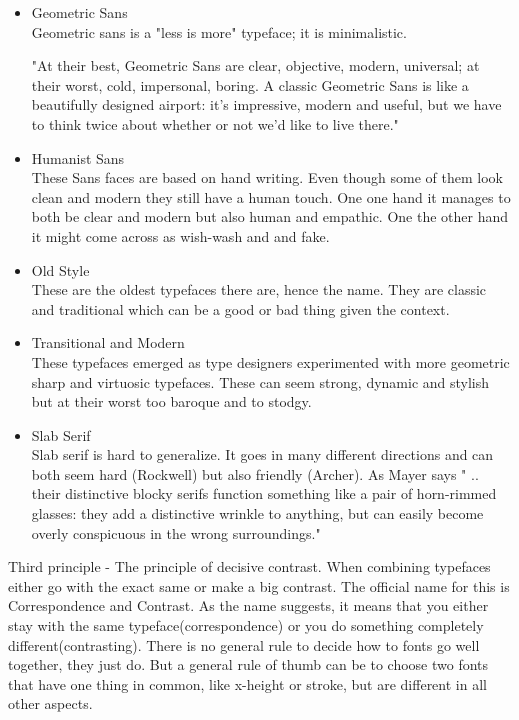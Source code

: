 \begin{itemize}

\item
Geometric Sans
\\
Geometric sans is a "less is more" typeface; it is minimalistic.

"At their best, Geometric Sans are clear, objective, modern, universal; at their worst, cold, impersonal, boring. A classic Geometric Sans is like a beautifully designed airport: it's impressive, modern and useful, but we have to think twice about whether or not we'd like to live there." \cite{Font} %

\item
Humanist Sans
\\
These Sans faces are based on hand writing. Even though some of them look clean and modern they still have a human touch. One one hand it manages to both be clear and modern but also human and empathic. One the other hand it might come across as wish-wash and and fake. \cite{Font}

\item
Old Style
\\
These are the oldest typefaces there are, hence the name. 
They are classic and traditional which can be a good or bad thing given the context. 

\item
Transitional and Modern
\\
These typefaces emerged as type designers experimented with more geometric sharp and virtuosic typefaces. 
These can seem strong, dynamic and stylish but at their worst too baroque and to stodgy. \cite{Font} 

\item
Slab Serif
\\
Slab serif is hard to generalize. It goes in many different directions and can both seem hard (Rockwell) but also friendly (Archer). As Mayer says " .. their distinctive blocky serifs function something like a pair of horn-rimmed glasses: they add a distinctive wrinkle to anything, but can easily become overly conspicuous in the wrong surroundings." \cite{Font}
\end{itemize}

Third principle - The principle of decisive contrast. When combining typefaces either go with the exact same or make a big contrast. The official name for this is Correspondence and Contrast. As the name suggests, it means that you either stay with the same typeface(correspondence) or you do something completely different(contrasting).\cite{Font}
There is no general rule to decide how to fonts go well together, they just do. But a general rule of thumb can be to choose two fonts that have one thing in common, like x-height or stroke, but are different in all other aspects. 

